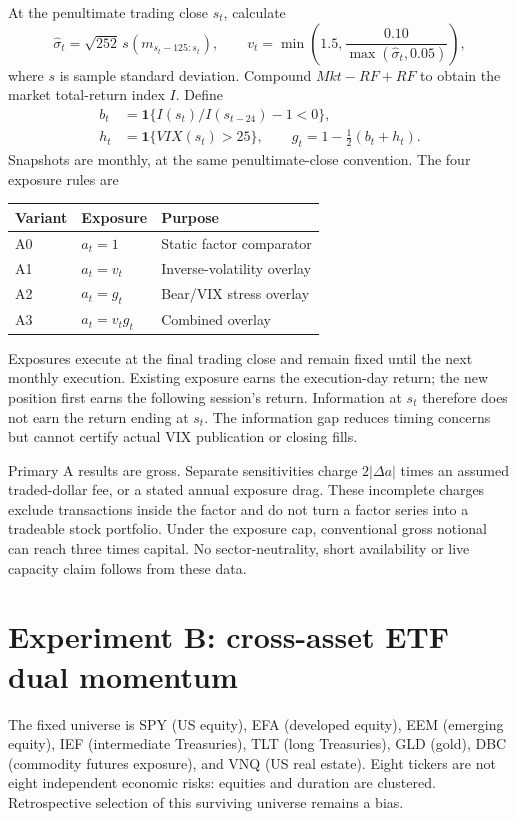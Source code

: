 \documentclass[11pt]{article}
\begin{document}
At the penultimate trading close $s_t$, calculate
\begin{equation}
\widehat\sigma_t=\sqrt{252}\,s(m_{s_t-125:s_t}),\qquad
v_t=\min\left(1.5,\frac{0.10}{\max(\widehat\sigma_t,0.05)}\right),
\end{equation}
where $s$ is sample standard deviation. Compound $Mkt-RF+RF$ to obtain the market total-return index $I$. Define
\begin{align}
b_t&=\mathbf{1}\{I(s_t)/I(s_{t-24})-1<0\},\\
h_t&=\mathbf{1}\{VIX(s_t)>25\},\qquad g_t=1-\tfrac12(b_t+h_t).
\end{align}
Snapshots are monthly, at the same penultimate-close convention. The four exposure rules are
\begin{center}\begin{tabular}{lll}\toprule
Variant & Exposure & Purpose\\\midrule
A0 & $a_t=1$ & Static factor comparator\\
A1 & $a_t=v_t$ & Inverse-volatility overlay\\
A2 & $a_t=g_t$ & Bear/VIX stress overlay\\
A3 & $a_t=v_tg_t$ & Combined overlay\\\bottomrule\end{tabular}\end{center}
Exposures execute at the final trading close and remain fixed until the next monthly execution. Existing exposure earns the execution-day return; the new position first earns the following session's return. Information at $s_t$ therefore does not earn the return ending at $s_t$. The information gap reduces timing concerns but cannot certify actual VIX publication or closing fills.

Primary A results are gross. Separate sensitivities charge $2|\Delta a|$ times an assumed traded-dollar fee, or a stated annual exposure drag. These incomplete charges exclude transactions inside the factor and do not turn a factor series into a tradeable stock portfolio. Under the exposure cap, conventional gross notional can reach three times capital. No sector-neutrality, short availability or live capacity claim follows from these data.
\clearpage
\section{Experiment B: cross-asset ETF dual momentum}
The fixed universe is SPY (US equity), EFA (developed equity), EEM (emerging equity), IEF (intermediate Treasuries), TLT (long Treasuries), GLD (gold), DBC (commodity futures exposure), and VNQ (US real estate). Eight tickers are not eight independent economic risks: equities and duration are clustered. Retrospective selection of this surviving universe remains a bias.
\end{document}
